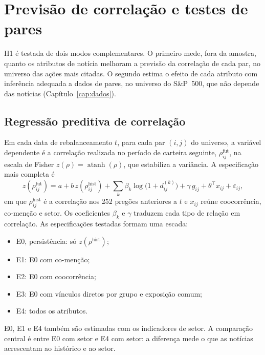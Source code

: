 \section{Previsão de correlação e testes de pares}
\label{sec:metodo-h1}

H1 é testada de dois modos complementares. O primeiro mede, fora da amostra, quanto os atributos de
notícia melhoram a previsão da correlação de cada par, no universo das ações mais citadas. O segundo
estima o efeito de cada atributo com inferência adequada a dados de pares, no universo do S\&P~500, que
não depende das notícias (Capítulo~\ref{cap:dados}).

\subsection{Regressão preditiva de correlação}

Em cada data de rebalanceamento $t$, para cada par $(i,j)$ do universo, a variável dependente é a
correlação realizada no período de carteira seguinte, $\rho^{\mathrm{fut}}_{ij}$, na escala de Fisher
$z(\rho)=\operatorname{atanh}(\rho)$, que estabiliza a variância. A especificação mais completa é
\begin{equation}
  z(\rho^{\mathrm{fut}}_{ij}) = a + b\,z(\rho^{\mathrm{hist}}_{ij})
  + \sum_k \beta_k\log\bigl(1+d^{(k)}_{ij}\bigr) + \gamma\, g_{ij}
  + \theta^\top x_{ij} + \varepsilon_{ij},
  \label{eq:h1}
\end{equation}
em que $\rho^{\mathrm{hist}}_{ij}$ é a correlação nos 252 pregões anteriores a $t$ e $x_{ij}$ reúne
coocorrência, co-menção e setor. Os coeficientes $\beta_k$ e $\gamma$ traduzem cada tipo de relação em
correlação. As especificações testadas formam uma escada:
\begin{itemize}
  \item E0, persistência: só $z(\rho^{\mathrm{hist}})$;
  \item E1: E0 com co-menção;
  \item E2: E0 com coocorrência;
  \item E3: E0 com vínculos diretos por grupo e exposição comum;
  \item E4: todos os atributos.
\end{itemize}
E0, E1 e E4 também são estimadas com os indicadores de setor. A comparação central é entre E0 com setor e
E4 com setor: a diferença mede o que as notícias acrescentam ao histórico e ao setor.

